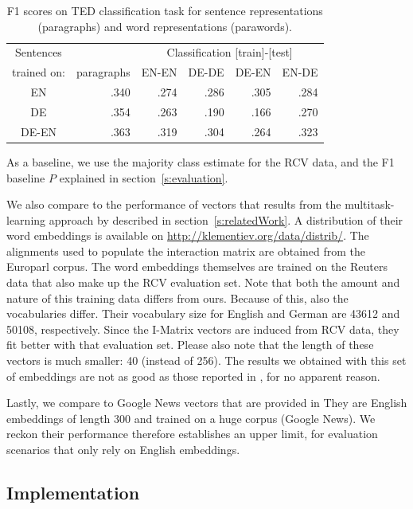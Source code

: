 \begin{table}[htb]
\center
\begin{tabular}{c | r|r r r r }
Sentences 		&		&	\multicolumn{4}{c}{Classification [train]-[test]}	\\
trained on: 		&paragraphs	&EN-EN	&DE-DE	&DE-EN	&EN-DE		\\\hline
EN			&.340		&.274		&.286		&.305		&.284		\\
DE			&.354		&.263		&.190		&.166		&.270		\\
DE-EN			&.363		&.319		&.304		&.264		&.323		\\
\end{tabular}
\caption{F1 scores on TED classification task for sentence representations (paragraphs) and word representations (parawords).}
\label{t:dbow_mono_bi}
\end{table}

As a baseline, we use the majority class estimate for the RCV data, and the F1 baseline $P$ explained in section~\ref{s:evaluation}. 

We also compare to the performance of vectors that results from the multitask-learning approach by \cite{klementiev2012inducing} described in section~\ref{s:relatedWork}. A distribution of their word embeddings is available on \url{http://klementiev.org/data/distrib/}. The alignments used to populate the interaction matrix are obtained from the Europarl corpus. The word embeddings themselves are trained on the Reuters data that also make up the RCV evaluation set. Note that both the amount and nature of this training data differs from ours. Because of this, also the vocabularies differ. Their vocabulary size for English and German are 43612 and 50108, respectively. Since the I-Matrix vectors are induced from RCV data, they fit better with that evaluation set. Please also note that the length of these vectors is much smaller: 40 (instead of 256). The results we obtained with this set of embeddings are not as good as those reported in \cite{klementiev2012inducing}, for no apparent reason.

Lastly, we compare to Google News vectors that are provided in \cite{mikolov2013efficient}
They are English embeddings of length 300 and trained on a huge corpus (Google News). We reckon their performance therefore establishes an upper limit, for evaluation scenarios that only rely on English embeddings.

\subsection{Implementation}

